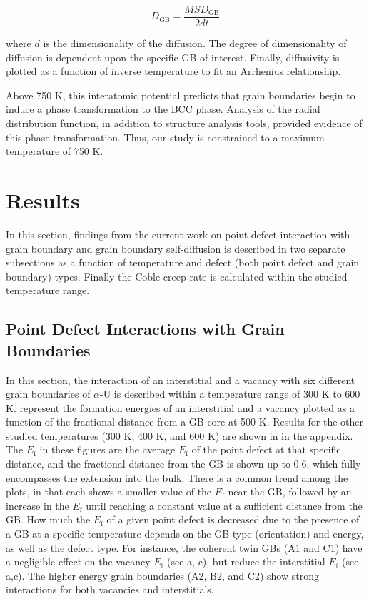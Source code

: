 \documentclass[review]{elsarticle}
\begin{document}
\begin{equation}
\label{eq:ein}
D_{\mathrm{GB}} = \frac{MSD_{\mathrm{GB}}}{2dt}
\end{equation}

\noindent where $d$ is the dimensionality of the diffusion. The degree of dimensionality of diffusion is dependent upon the specific GB of interest. Finally, diffusivity is plotted as a function of inverse temperature to fit an Arrhenius relationship. 

Above 750 K, this interatomic potential predicts that grain boundaries begin to induce a phase transformation to the BCC phase. Analysis of the radial distribution function, in addition to structure analysis tools, provided evidence of this phase transformation. Thus, our study is constrained to a maximum temperature of 750 K. 


\FloatBarrier
\section{Results}

In this section, findings from the current work on point defect interaction with grain boundary and grain boundary self-diffusion is described in two separate subsections as a function of temperature and defect (both point defect and grain boundary) types. Finally the Coble creep rate is calculated within the studied temperature range.

\subsection{Point Defect Interactions with Grain Boundaries}

In this section, the interaction of an interstitial and a vacancy with six different grain boundaries of $\alpha$-U is described within a temperature range of 300 K to 600 K.  represent the formation energies of an interstitial and a vacancy plotted as a function of the fractional distance from a GB core at 500 K. Results for the other studied temperatures (300 K, 400 K, and 600 K) are shown in  in the appendix. The $E_{\mathrm{f}}$ in these figures are the average $E_{\mathrm{f}}$ of the point defect at that specific distance, and the fractional distance from the GB is shown up to 0.6, which fully encompasses the extension into the bulk. There is a common trend among the plots, in that each shows a smaller value of the $E_{\mathrm{f}}$ near the GB, followed by an increase in the $E_{\mathrm{f}}$ until reaching a constant value at a sufficient distance from the GB. How much the $E_{\mathrm{f}}$ of a given point defect is decreased due to the presence of a GB at a specific temperature depends on the GB type (orientation) and energy, as well as the defect type. For instance, the coherent twin GBs (A1 and C1) have a negligible effect on the vacancy $E_{\mathrm{f}}$ (see a, c), but reduce the interstitial $E_{\mathrm{f}}$ (see  a,c). The higher energy grain boundaries (A2, B2, and C2) show strong interactions for both vacancies and interstitials. 
\end{document}
